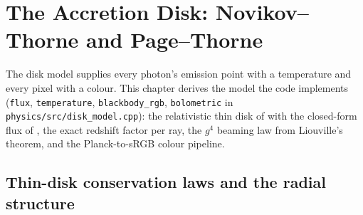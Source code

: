 \chapter{The Accretion Disk: Novikov--Thorne and Page--Thorne}
\label{ch:disk}

The disk model supplies every photon's emission point with a temperature
and every pixel with a colour. This chapter derives the model the code
implements (\texttt{flux}, \texttt{temperature}, \texttt{blackbody\_rgb},
\texttt{bolometric} in \texttt{physics/src/disk\_model.cpp}): the
relativistic thin disk of \citet{NovikovThorne1973} with the closed-form
flux of \citet{PageThorne1974}, the exact redshift factor per ray, the
$g^4$ beaming law from Liouville's theorem, and the Planck-to-sRGB
colour pipeline.

\section{Thin-disk conservation laws and the radial structure}
\label{sec:thindiskstructure}

